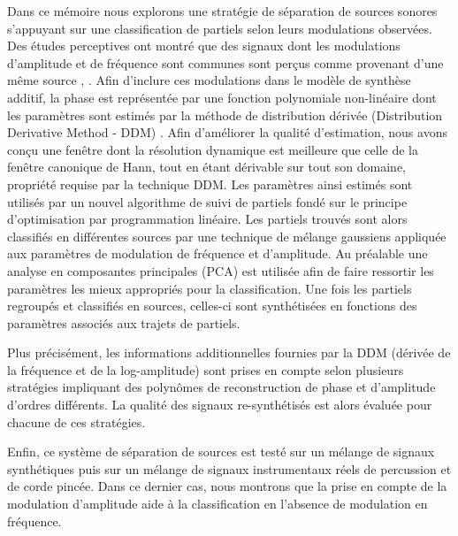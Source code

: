 Dans ce mémoire nous explorons une stratégie de séparation de sources sonores
s’appuyant sur une classification de partiels selon leurs modulations observées.
Des études perceptives ont montré que des signaux dont les modulations
d’amplitude et de fréquence sont communes sont perçus comme provenant d’une même
source \cite{mcadams1989segregation}, \cite{marin1991segregation}. Afin
d’inclure ces modulations dans le modèle de synthèse additif, la phase est
représentée par une fonction polynomiale non-linéaire dont les paramètres sont
estimés par la méthode de distribution dérivée (Distribution Derivative Method -
DDM) \cite{betser2009sinusoidal}. Afin d’améliorer la qualité d’estimation, nous
avons conçu une fenêtre dont la résolution dynamique est meilleure que celle de
la fenêtre canonique de Hann, tout en étant dérivable sur tout son domaine,
propriété requise par la technique DDM. Les paramètres ainsi estimés sont
utilisés par un nouvel algorithme de suivi de partiels fondé sur le principe
d’optimisation par programmation linéaire. Les partiels trouvés sont alors
classifiés en différentes sources par une technique de mélange gaussiens
appliquée aux paramètres de modulation de fréquence et d’amplitude. Au
préalable une analyse en composantes principales (PCA) est utilisée afin de
faire ressortir les paramètres les mieux appropriés pour la classification.  Une
fois les partiels regroupés et classifiés en sources, celles-ci sont
synthétisées en fonctions des paramètres associés aux trajets de partiels.

Plus précisément, les informations additionnelles fournies par la DDM (dérivée
de la fréquence et de la log-amplitude) sont prises en compte selon plusieurs
stratégies impliquant des polynômes de reconstruction de phase et d’amplitude
d’ordres différents. La qualité des signaux re-synthétisés est alors évaluée
pour chacune de ces stratégies. 

Enfin, ce système de séparation de sources est testé sur un mélange de signaux
synthétiques puis sur un mélange de signaux instrumentaux réels de percussion et
de corde pincée. Dans ce dernier cas, nous montrons que la prise en compte de la
modulation d’amplitude aide à la classification en l’absence de modulation en
fréquence.
